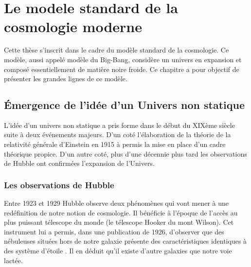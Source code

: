 \chapter{Le modele standard de la cosmologie moderne}
 \label{ch:introduction_physique}

Cette thèse s'inscrit dans le cadre du modèle standard de la cosmologie.
Ce modèle, aussi appelé modèle du Big-Bang, considère un univers en expansion et composé essentiellement de matière noire froide. %
Ce chapitre a pour objectif de présenter les grandes lignes de ce modèle.

\section{Émergence de l'idée d'un Univers non statique}



L'idée d'un univers non statique a pris forme dans le début du XIXème siècle suite à deux événements majeurs.
D'un coté l'élaboration de la théorie de la relativité générale d'Einstein en 1915 à permis la mise en place d'un cadre théorique propice.
D'un autre coté, plus d'une décennie plus tard les observations de Hubble ont confirmées l'expansion de l'Univers.

\subsection{Les observations de Hubble}

Entre 1923 et 1929 Hubble observe deux phénomènes qui vont mener à une redéfinition de notre notion de cosmologie.
Il bénéficie à l'époque de l'accès au plus puissant télescope du monde (le télescope Hooker du mont Wilson).
Cet instrument lui a permis, dans une publication de 1926, d'observer que des nébuleuses situées hors de notre galaxie présente des caractéristiques identiques à des système d'étoile \citep{1926ApJ....63..236H}.
Il en déduit qu'il existe d'autre galaxies que notre voie lactée.

